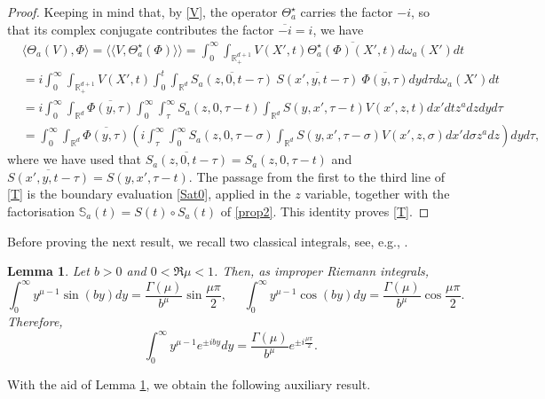 \documentclass[11pt,letter]{amsart}
\def \RN {\mathbb{R}_+^{d+1}}
\def \G{\Gamma}
\newcommand{\Rd}{\mathbb R^d}
\numberwithin{equation}{section}
\newcommand{\sa}{\langle}
\newcommand{\da}{\rangle}
\newtheorem{lemma}[theorem]{Lemma}
\numberwithin{equation}{section}
\begin{document}
\begin{proof}
Keeping in mind that, by \eqref{V}, the operator $\Theta_a^\star$ carries the factor $-i$, so that its complex conjugate contributes the factor $\overline{-i} = i$, we have
\begin{align*}
& \sa \Theta_a(V),\Phi\da = \sa\sa V,\Theta_a^\star(\Phi)\da\da = \int_0^\infty \int_{\RN} V(X',t) \overline{\Theta_a^\star(\Phi)(X',t)} d\omega_a(X') dt
\\
& = i \int_0^\infty \int_{\RN} V(X',t) \int_0^{t} \int_{\Rd}  \overline{S_a(z,0,t-\tau)}\ \overline{S(x',y,t-\tau)}\ \overline{\Phi(y,\tau)} dy d\tau d\omega_a(X') dt
\\
& = i \int_0^\infty \int_{\Rd} \overline{\Phi(y,\tau)}  \int_0^\infty  \int_\tau^{\infty} S_a(z,0,\tau-t) \int_{\Rd}   S(y,x',\tau-t) V(x',z,t) dx' dt  z^a dz dy d\tau
\\
& = \int_0^\infty \int_{\Rd} \overline{\Phi(y,\tau)} \left(i \int_\tau^{\infty} \int_0^\infty   S_a(z,0,\tau-\sigma) \int_{\Rd}   S(y,x',\tau-\sigma) V(x',z,\sigma) dx' d\sigma  z^a dz\right) dy d\tau,
\end{align*}
where we have used that $\overline{S_a(z,0,t-\tau)} = S_a(z,0,\tau-t)$ and $\overline{S(x',y,t-\tau)} = S(y,x',\tau-t)$. The passage from the first to the third line of \eqref{T} is the boundary evaluation \eqref{Sat0}, applied in the $z$ variable, together with the factorisation $\mathbb S_a(t) = S(t)\circ S_a(t)$ of \eqref{prop2}.
This identity proves \eqref{T}.

\end{proof}

Before proving the next result, we recall two classical integrals, see, e.g., \cite[formulas 3.761.4 \& 3.761.9, p.420-1]{GR}.

\begin{lemma}\label{L:cis}
Let $b>0$ and $0<\Re \mu<1$. Then, as improper Riemann integrals,
\begin{equation}\label{sincosy}
\int_0^\infty y^{\mu-1} \sin(by) dy = \frac{\G(\mu)}{b^\mu} \sin \frac{\mu \pi}{2},\ \ \ \ \ \ \int_0^\infty y^{\mu-1} \cos(by) dy = \frac{\G(\mu)}{b^\mu} \cos \frac{\mu \pi}{2}.
\end{equation}
Therefore,
\begin{equation}\label{ei}
\int_0^\infty y^{\mu-1} e^{\pm i by} dy = \frac{\G(\mu)}{b^\mu} e^{\pm i\frac{\mu \pi}{2}}.
\end{equation} 
\end{lemma}


With the aid of Lemma \ref{L:cis}, we obtain the following auxiliary result.
\end{document}
